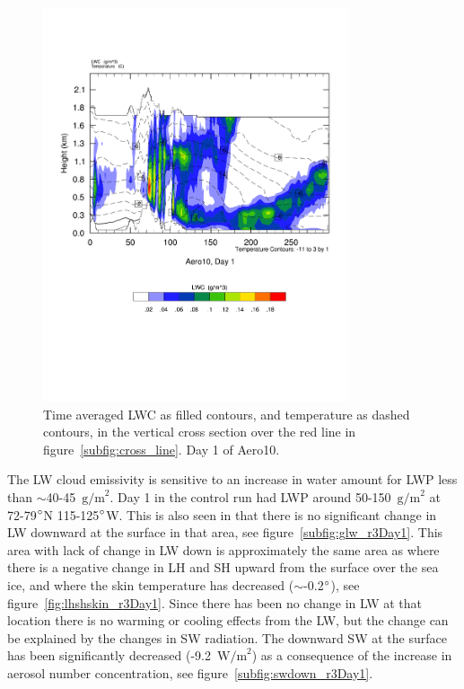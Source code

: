 \begin{figure}
	\centering
	\includegraphics[width=0.8\textwidth]{results/aero10/Sec_LWC_Aero10_Day1.pdf}
	\caption{Time averaged LWC as filled contours, and temperature as dashed contours, in the vertical cross section over the red line in figure~\ref{subfig:cross_line}. Day 1 of Aero10.}
	\label{fig:cross_LWC_r3Day1}
\end{figure}

The LW cloud emissivity is sensitive to an increase in water amount for LWP less than $\sim$40-45~$\text{g/m}^2$. Day 1 in the control run had LWP around 50-150~$\text{g/m}^2$ at 72-79$\degree$N 115-125$\degree$W.
This is also seen in that there is no significant change in LW downward at the surface in that area, see figure~\ref{subfig:glw_r3Day1}. This area with lack of change in LW down is approximately the same area as where there is a negative change in LH and SH upward from the surface over the sea ice, and where the skin temperature has decreased ($\sim$-0.2$\degree$), see figure~\ref{fig:lhshskin_r3Day1}. Since there has been no change in LW at that location there is no warming or cooling effects from the LW, but the change can be explained by the changes in SW radiation. The downward SW at the surface has been significantly decreased (-9.2~$\text{W/m}^2$) as a consequence of the increase in aerosol number concentration, see figure~\ref{subfig:swdown_r3Day1}.


